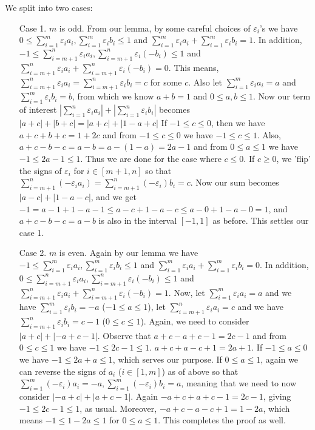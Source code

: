 \documentclass[11pt,a4paper]{article}
\begin{document}
\begin{itemize}
We split into two cases: 
\begin{itemize}
\item [Case 1.] $m$ is odd. 
From our lemma, by some careful choices of $\varepsilon_i$'s we have 
$0\le\sum_{i=1}^m \varepsilon_i a_i, \sum_{i=1}^m \varepsilon_i b_i\le 1$ and $\sum_{i=1}^m \varepsilon_i a_i +\sum_{i=1}^m \varepsilon_i b_i=1$. 
In addition, 
$-1\le\sum_{i=m+1}^n \varepsilon_i a_i, \sum_{i=m+1}^n \varepsilon_i (-b_i)\le 1$ and $\sum_{i=m+1}^n \varepsilon_i a_i +\sum_{i=m+1}^n \varepsilon_i (-b_i)=0$. 
This means, $\sum_{i=m+1}^n \varepsilon_i a_i=\sum_{i=m+1}^n \varepsilon_i b_i=c$ for some $c$. 
Also let $\sum_{i=1}^m \varepsilon_i a_i=a$ and $\sum_{i=1}^m \varepsilon_i b_i=b$, from which we know 
$a+b=1$ and $0\le a, b\le 1$. 
Now our term of interest $\left| \sum_{i=1}^n \varepsilon_i a_i \right| + \left| \sum_{i=1}^n \varepsilon_i b_i \right|$ becomes $|a+c|+|b+c|=|a+c|+|1-a+c|$
If $-1\le c\le 0$, then we have 
$a+c+b+c=1+2c$ and from $-1\le c\le 0$ we have $-1\le c\le 1$. 
Also, $a+c-b-c=a-b=a-(1-a)=2a-1$ and from $0\le a\le 1$ we have $-1\le 2a-1\le 1$. 
Thus we are done for the case where $c\le 0$. 
If $c\ge 0$, we 'flip' the signs of $\varepsilon_i$ for $i\in [m+1, n]$ so that 
$\sum_{i=m+1}^n (-\varepsilon_i a_i)=\sum_{i=m+1}^n (-\varepsilon_i) b_i=c$. 
Now our sum becomes $|a-c|+|1-a-c|$, and we get 
$-1=a-1+1-a-1\le a-c+1-a-c\le a-0+1-a-0=1$, and $a+c-b-c=a-b$ is also in the interval $[-1, 1]$ as before. 
This settles our case 1. 

\item [Case 2.] $m$ is even. 
 Again by our lemma we have 
$-1\le\sum_{i=1}^m \varepsilon_i a_i, \sum_{i=1}^m \varepsilon_i b_i\le 1$ and $\sum_{i=1}^m \varepsilon_i a_i +\sum_{i=1}^m \varepsilon_i b_i=0$. 
In addition, 
$0\le\sum_{i=m+1}^n \varepsilon_i a_i, \sum_{i=m+1}^n \varepsilon_i (-b_i)\le 1$ and $\sum_{i=m+1}^n \varepsilon_i a_i +\sum_{i=m+1}^n \varepsilon_i (-b_i)=1$. 
Now, let $\sum_{i=1}^m \varepsilon_i a_i=a$ and we have $\sum_{i=1}^m \varepsilon_i b_i=-a$ ($-1\le a\le 1$), 
let $\sum_{i=m+1}^n \varepsilon_i a_i=c$ and we have $\sum_{i=m+1}^n \varepsilon_i b_i=c-1$ ($0\le c\le 1$). 
Again, we need to consider $|a+c|+|-a+c-1|$. 
Observe that $a+c-a+c-1=2c-1$ and from $0\le c\le 1$ we have $-1\le 2c-1\le 1$. 
$a+c+a-c+1=2a+1$. If $-1\le a\le 0$ we have $-1\le 2a+a\le 1$, which serves our purpose. 
If $0\le a\le 1$, again we can reverse the signs of $a_i$ ($i\in [1,m]$) as of above so that 
$\sum_{i=1}^m (-\varepsilon_i) a_i=-a, \sum_{i=1}^m (-\varepsilon_i) b_i=a$, 
meaning that we need to now consider 
$|-a+c|+|a+c-1|$. 
Again $-a+c+a+c-1=2c-1$, giving $-1\le 2c-1\le 1$, as usual. 
Moreover, $-a+c-a-c+1=1-2a$, which means $-1\le 1-2a\le 1$ for $0\le a\le 1$. 
This completes the proof as well. 
\end{itemize}


\end{itemize}
\end{document}
